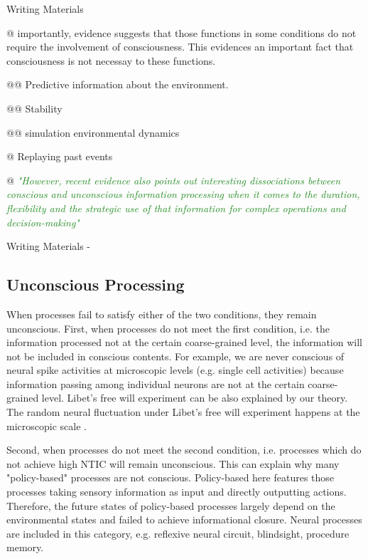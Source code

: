 \documentclass[utf8]{article}
\newenvironment{WritingMaterials} %
    	{
            \begin{tcolorbox}[enhanced,
                title=-,
                size=small,
                colbacktitle=Aquamarine,
                drop fuzzy shadow,
                fontupper=\small,
                boxrule=0.4pt,
                colback=Aquamarine!10!white,
                sharp corners]
                Writing Materials
            \end{tcolorbox}
            \begin{easylist}[itemize]
    	}
    	{
            \end{easylist}  
            \begin{tcolorbox}[enhanced,
                halign=flush right,
                halign title=right,
                size=small,
                colbacktitle=Aquamarine,
                drop fuzzy shadow,
                fontupper=\small,
                boxrule=0.4pt,
                colback=Aquamarine,
                colupper=White,
                sharp corners]
                Writing Materials -
            \end{tcolorbox}        
    	}
\newcommand{\rewrite}[1]{\textcolor{ForestGreen}{\textit{"#1"}}\newline}
\begin{document}
	    \begin{WritingMaterials}
	        @ importantly, evidence suggests that those functions in some conditions do not require the involvement of consciousness. This evidences an important fact that consciousness is not necessay to these functions. 
	        
	        
	        @@ Predictive information about the environment.
	        
	        @@ Stability 
	        
	        @@ simulation environmental dynamics 
	        
	        @ Replaying past events
	        
	        @ \rewrite{However, recent evidence also points out interesting dissociations between conscious and unconscious information processing when it comes to the duration, flexibility and the strategic use of that information for complex operations and decision-making} \cite{van2012role}
	        
	    \end{WritingMaterials}
	    
	    
		
		\subsection{Unconscious Processing}
		When processes fail to satisfy either of the two conditions, they remain unconscious. First, when processes do not meet the first condition, i.e. the information processed not at the certain coarse-grained level, the information will not be included in conscious contents. For example, we are never conscious of neural spike activities at microscopic levels (e.g. single cell activities) because information passing among individual neurons are not at the certain coarse-grained level. Libet's free will experiment can be also explained by our theory. The random neural fluctuation under Libet's free will experiment happens at the microscopic scale \citep{SchurgerE2904}. 
		
		Second, when processes do not meet the second condition, i.e. processes which do not achieve high NTIC will remain unconscious. This can explain why many "policy-based" processes are not conscious. Policy-based here features those processes taking sensory information as input and directly outputting actions. Therefore, the future states of policy-based processes largely depend on the environmental states and failed to achieve informational closure. Neural processes are included in this category, e.g. reflexive neural circuit, blindsight, procedure memory. 
		
\end{document}
